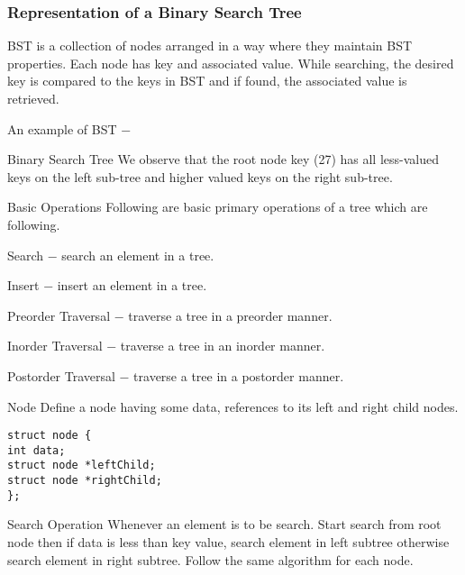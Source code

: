 \documentclass{beamer}
\begin{document}
\begin{frame}
\frametitle{Representation of a Binary Search Tree}
BST is a collection of nodes arranged in a way where they maintain BST properties. Each node has key and associated value. While searching, the desired key is compared to the keys in BST and if found, the associated value is retrieved.

An example of BST −
\end{frame}
\begin{frame}
Binary Search Tree
We observe that the root node key (27) has all less-valued keys on the left sub-tree and higher valued keys on the right sub-tree.

Basic Operations
Following are basic primary operations of a tree which are following.

Search − search an element in a tree.

Insert − insert an element in a tree.

Preorder Traversal − traverse a tree in a preorder manner.

Inorder Traversal − traverse a tree in an inorder manner.

Postorder Traversal − traverse a tree in a postorder manner.
\end{frame}
\begin{frame}[fragile]
Node
Define a node having some data, references to its left and right child nodes.
\begin{verbatim}
struct node {
int data;   
struct node *leftChild;
struct node *rightChild;
};
\end{verbatim}

\end{frame}
\begin{frame}
Search Operation
Whenever an element is to be search. Start search from root node then if data is less than key value, search element in left subtree otherwise search element in right subtree. Follow the same algorithm for each node.
\end{frame}
%	
%	
%			
%			
\end{document}
